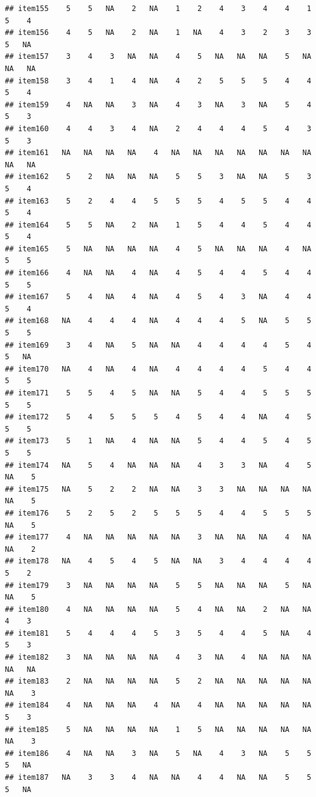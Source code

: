 \documentclass[
  man]{apa6}
\begin{document}
\begin{verbatim}
## item155    5    5   NA    2   NA    1    2    4    3    4    4    1    5    4
## item156    4    5   NA    2   NA    1   NA    4    3    2    3    3    5   NA
## item157    3    4    3   NA   NA    4    5   NA   NA   NA    5   NA   NA   NA
## item158    3    4    1    4   NA    4    2    5    5    5    4    4    5    4
## item159    4   NA   NA    3   NA    4    3   NA    3   NA    5    4    5    3
## item160    4    4    3    4   NA    2    4    4    4    5    4    3    5    3
## item161   NA   NA   NA   NA    4   NA   NA   NA   NA   NA   NA   NA   NA   NA
## item162    5    2   NA   NA   NA    5    5    3   NA   NA    5    3    5    4
## item163    5    2    4    4    5    5    5    4    5    5    4    4    5    4
## item164    5    5   NA    2   NA    1    5    4    4    5    4    4    5    4
## item165    5   NA   NA   NA   NA    4    5   NA   NA   NA    4   NA    5    5
## item166    4   NA   NA    4   NA    4    5    4    4    5    4    4    5    5
## item167    5    4   NA    4   NA    4    5    4    3   NA    4    4    5    4
## item168   NA    4    4    4   NA    4    4    4    5   NA    5    5    5    5
## item169    3    4   NA    5   NA   NA    4    4    4    4    5    4    5   NA
## item170   NA    4   NA    4   NA    4    4    4    4    5    4    4    5    5
## item171    5    5    4    5   NA   NA    5    4    4    5    5    5    5    5
## item172    5    4    5    5    5    4    5    4    4   NA    4    5    5    5
## item173    5    1   NA    4   NA   NA    5    4    4    5    4    5    5    5
## item174   NA    5    4   NA   NA   NA    4    3    3   NA    4    5   NA    5
## item175   NA    5    2    2   NA   NA    3    3   NA   NA   NA   NA   NA    5
## item176    5    2    5    2    5    5    5    4    4    5    5    5   NA    5
## item177    4   NA   NA   NA   NA   NA    3   NA   NA   NA    4   NA   NA    2
## item178   NA    4    5    4    5   NA   NA    3    4    4    4    4    5    2
## item179    3   NA   NA   NA   NA    5    5   NA   NA   NA    5   NA   NA    5
## item180    4   NA   NA   NA   NA    5    4   NA   NA    2   NA   NA    4    3
## item181    5    4    4    4    5    3    5    4    4    5   NA    4    5    3
## item182    3   NA   NA   NA   NA    4    3   NA    4   NA   NA   NA   NA   NA
## item183    2   NA   NA   NA   NA    5    2   NA   NA   NA   NA   NA   NA    3
## item184    4   NA   NA   NA    4   NA    4   NA   NA   NA   NA   NA    5    3
## item185    5   NA   NA   NA   NA    1    5   NA   NA   NA   NA   NA   NA    3
## item186    4   NA   NA    3   NA    5   NA    4    3   NA    5    5    5   NA
## item187   NA    3    3    4   NA   NA    4    4   NA   NA    5    5    5   NA

\end{verbatim}
\end{document}
